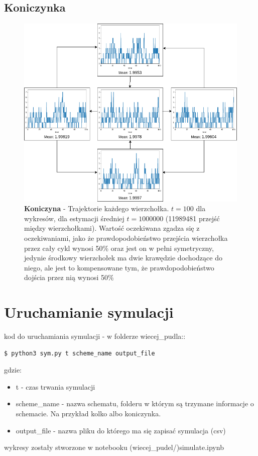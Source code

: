 \documentclass{article}
\begin{document}
\subsection{Koniczynka}
\begin{figure}[h!]
\centering
\includegraphics[width=1\linewidth]{koniczyna1/koniczyna1}
\caption{\textbf{Koniczyna} - Trajektorie każdego wierzchołka. \newline
 $t=100$ dla wykresów, dla estymacji średniej $t=1000000$ (11989481 przejść między wierzchołkami). Wartość oczekiwana zgadza się z oczekiwaniami, jako że prawdopodobieństwo przejścia wierzchołka przez cały cykl wynosi 50\% oraz jest on w pełni symetryczny, jedynie środkowy wierzchołek ma dwie krawędzie dochodzące do niego, ale jest to kompensowane tym, że prawdopodobieństwo dojścia przez nią wynosi 50\%  }
\end{figure}

\newpage


\section{Uruchamianie symulacji}
\noindent kod do uruchamiania symulacji - w folderze wiecej\_pudla::
\begin{lstlisting}[language=bash]
  $ python3 sym.py t scheme_name output_file 
\end{lstlisting}
gdzie: \begin{itemize}
\item t - czas trwania symulacji
\item scheme\_name - nazwa schematu, folderu w którym są trzymane informacje o schemacie. Na przykład kolko albo koniczynka.
\item output\_file - nazwa pliku do którego ma się zapisać symulacja (csv)
\end{itemize}

wykresy zostały stworzone w notebooku (wiecej\_pudel/)simulate.ipynb
\end{document}
